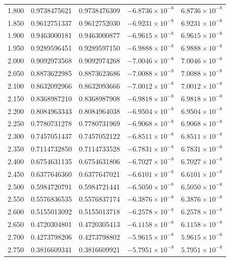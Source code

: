 \documentclass[11pt,a4paper]{article}
\begin{document}
\begin{longtable}{rrrrr}
1.800 & 0.9738475621 & 0.9738476309 & $-6.8736\times 10^{-8}$ & $6.8736\times 10^{-8}$ \\
1.850 & 0.9612751337 & 0.9612752030 & $-6.9231\times 10^{-8}$ & $6.9231\times 10^{-8}$ \\
1.900 & 0.9463000181 & 0.9463000877 & $-6.9615\times 10^{-8}$ & $6.9615\times 10^{-8}$ \\
1.950 & 0.9289596451 & 0.9289597150 & $-6.9888\times 10^{-8}$ & $6.9888\times 10^{-8}$ \\
2.000 & 0.9092973568 & 0.9092974268 & $-7.0046\times 10^{-8}$ & $7.0046\times 10^{-8}$ \\
2.050 & 0.8873622985 & 0.8873623686 & $-7.0088\times 10^{-8}$ & $7.0088\times 10^{-8}$ \\
2.100 & 0.8632092966 & 0.8632093666 & $-7.0012\times 10^{-8}$ & $7.0012\times 10^{-8}$ \\
2.150 & 0.8368987210 & 0.8368987908 & $-6.9818\times 10^{-8}$ & $6.9818\times 10^{-8}$ \\
2.200 & 0.8084963343 & 0.8084964038 & $-6.9504\times 10^{-8}$ & $6.9504\times 10^{-8}$ \\
2.250 & 0.7780731278 & 0.7780731969 & $-6.9068\times 10^{-8}$ & $6.9068\times 10^{-8}$ \\
2.300 & 0.7457051437 & 0.7457052122 & $-6.8511\times 10^{-8}$ & $6.8511\times 10^{-8}$ \\
2.350 & 0.7114732850 & 0.7114733528 & $-6.7831\times 10^{-8}$ & $6.7831\times 10^{-8}$ \\
2.400 & 0.6754631135 & 0.6754631806 & $-6.7027\times 10^{-8}$ & $6.7027\times 10^{-8}$ \\
2.450 & 0.6377646360 & 0.6377647021 & $-6.6101\times 10^{-8}$ & $6.6101\times 10^{-8}$ \\
2.500 & 0.5984720791 & 0.5984721441 & $-6.5050\times 10^{-8}$ & $6.5050\times 10^{-8}$ \\
2.550 & 0.5576836535 & 0.5576837174 & $-6.3876\times 10^{-8}$ & $6.3876\times 10^{-8}$ \\
2.600 & 0.5155013092 & 0.5155013718 & $-6.2578\times 10^{-8}$ & $6.2578\times 10^{-8}$ \\
2.650 & 0.4720304801 & 0.4720305413 & $-6.1158\times 10^{-8}$ & $6.1158\times 10^{-8}$ \\
2.700 & 0.4273798206 & 0.4273798802 & $-5.9615\times 10^{-8}$ & $5.9615\times 10^{-8}$ \\
2.750 & 0.3816609341 & 0.3816609921 & $-5.7951\times 10^{-8}$ & $5.7951\times 10^{-8}$ \\

\end{longtable}
\end{document}

